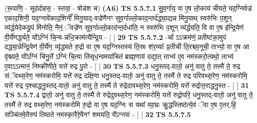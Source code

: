 \documentclass[17pt]{extarticle}
\begin{document}
                  \newline
                      (रू॒पाणि॒ - सूद॑दोहस॒ - स्तया॒ - षोड॑श च)  \textbf{(A6)} \newline \newline
                                        \textbf{ TS 5.5.7.1} \newline
                  सु॒व॒र्गाय॒ वा ए॒ष लो॒काय॑ चीयते॒ यद॒ग्निर्वज्र॑ एकाद॒शिनी॒ यद॒ग्नावे॑काद॒शिनीं᳚ मिनु॒याद्-वज्रे॑णैनꣳ सुव॒र्गाल्लो॒काद॒न्तर्द॑द्ध्या॒द्यन्न मि॑नु॒याथ् स्वरु॑भिः प॒शून् व्य॑र्द्धयेदेकयू॒पं मि॑नोति॒ नैनं॒ ॅवज्रे॑ण सुव॒र्गाल्लो॒काद॑न्त॒र्दधा॑ति॒ न स्वरु॑भिः प॒शून् व्य॑र्द्धयति॒ वि वा ए॒ष इ॑न्द्रि॒येण॑ वी॒र्ये॑णर्द्ध्यते॒ यो᳚ऽग्निं चि॒न्व-न्न॑धि॒क्राम॑त्यैन्द्रि॒य - [  ] \textbf{  29} \newline
                  \newline
                                \textbf{ TS 5.5.7.2} \newline
                  -र्चा ऽऽक्रम॑णं॒ प्रतीष्ट॑का॒मुप॑ दद्ध्या॒न्नेन्द्रि॒येण॑ वी॒र्ये॑ण॒ व्यृ॑द्ध्यते रु॒द्रो वा ए॒ष यद॒ग्निस्तस्य॑ ति॒स्रः श॑र॒व्याः᳚ प्र॒तीची॑ ति॒रश्च्य॒नूची॒ ताभ्यो॒ वा ए॒ष आ वृ॑श्च्यते॒ यो᳚ऽग्निं चि॑नु॒ते᳚ ऽग्निं चि॒त्वा ति॑सृध॒न्वमया॑चितं ब्राह्म॒णाय॑ दद्या॒त् ताभ्य॑ ए॒व नम॑स्करो॒त्यथो॒ ताभ्य॑ ए॒वाऽऽत्मानं॒ निष्क्री॑णीते॒ यत्ते॑ रुद्र पु॒रो - [  ] \textbf{  30} \newline
                  \newline
                                \textbf{ TS 5.5.7.3} \newline
                  धनु॒स्तद्-वातो॒ अनु॑ वातु ते॒ तस्मै॑ ते॒ रुद्र संॅवथ्स॒रेण॒ नम॑स्करोमि॒ यत्ते॑ रुद्र दक्षि॒णा धनु॒स्तद्-वातो॒ अनु॑ वातु ते॒ तस्मै॑ ते रुद्र परिवथ्स॒रेण॒ नम॑स्करोमि॒ यत्ते॑ रुद्र प॒श्चाद्धनु॒स्तद्-वातो॒ अनु॑ वातु ते॒ तस्मै॑ ते रुद्रेदावथ्स॒रेण॒ नम॑स्करोमि॒ यत्ते॑ रुद्रोत्त॒राद्धनु॒स्त - [  ] \textbf{  31} \newline
                  \newline
                                \textbf{ TS 5.5.7.4} \newline
                  द्वातो॒ अनु॑ वातु ते॒ तस्मै॑ ते रुद्रेदुवथ्स॒रेण॒ नम॑स्करोमि॒ यत्ते॑ रुद्रो॒परि॒ धनु॒स्तद्-वातो॒ अनु॑ वातु ते॒ तस्मै॑ ते रुद्र वथ्स॒रेण॒ नम॑स्करोमि रु॒द्रो वा ए॒ष यद॒ग्निः स यथा᳚ व्या॒घ्रः क्रु॒द्धस्तिष्ठ॑त्ये॒वं ॅवा ए॒ष ए॒तर्.हि॒ सञ्चि॑तमे॒तैरुप॑ तिष्ठते नमस्का॒रैरे॒वैनꣳ॑ शमयति॒ ये᳚ऽग्नयः॑ - [  ] \textbf{  32} \newline
                  \newline
                                \textbf{ TS 5.5.7.5} \newline
\end{document}
